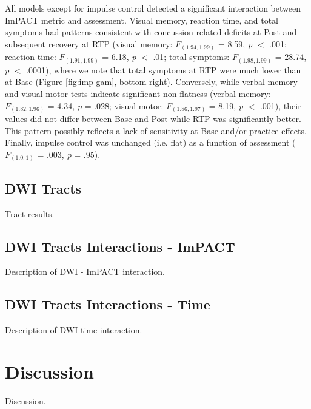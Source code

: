 \documentclass[12pt]{article}
\begin{document}
All models except for impulse control detected a significant interaction between ImPACT metric and assessment. Visual memory, reaction time, and total symptoms had patterns consistent with concussion-related deficits at Post and subsequent recovery at RTP (visual memory: $F_{(1.94, 1.99)}$ = 8.59, \textit{p} $<$ .001; reaction time: $F_{(1.91, 1.99)}$ = 6.18, \textit{p} $<$ .01; total symptoms: $F_{(1.98, 1.99)}$ = 28.74, \textit{p} $<$ .0001), where we note that total symptoms at RTP were much lower than at Base (Figure \ref{fig:imp-gam}, bottom right). Conversely, while verbal memory and visual motor tests indicate significant non-flatness (verbal memory: $F_{(1.82, 1.96)}$ = 4.34, \textit{p} = .028; visual motor: $F_{(1.86, 1.97)}$ = 8.19, \textit{p} $<$ .001), their values did not differ between Base and Post while RTP was significantly better. This pattern possibly reflects a lack of sensitivity at Base and/or practice effects. Finally, impulse control was unchanged (i.e. flat) as a function of assessment ($F_{(1.0, 1)}$ = .003, \textit{p} = .95).


\subsection{DWI Tracts}
\label{ssec:res-dwi-tract}
Tract results.


\subsection{DWI Tracts Interactions - ImPACT}
\label{ssec:res-dwi-imp}
Description of DWI - ImPACT interaction.


\subsection{DWI Tracts Interactions - Time}
\label{ssec:res-dwi-time}
Description of DWI-time interaction.



\section{Discussion}
\label{sec:disc}
Discussion.

\end{document}
